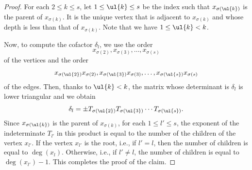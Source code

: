 \begin{proof}
For each $2 \leq k \leq s$, let $1 \leq \ul{k} \leq s$ be the index such that $x_{\sigma(\ul{k})}$ is the parent of $x_{\sigma(k)}$.
It is the unique vertex that is adjacent to $x_{\sigma(k)}$ and whose depth is less than that of $x_{\sigma(k)}$.
Note that we have $1 \leq \ul{k} < k$.

Now, to compute the cofactor $\delta_l$, we use the order
\[
x_{\sigma(2)}, x_{\sigma(3)}, \dots, x_{\sigma(s)}
\]
of the vertices and the order
\[
x_{\sigma(\ul{2})} x_{\sigma(2)}, x_{\sigma(\ul{3})} x_{\sigma(3)}, \dots, x_{\sigma(\ul{s})} x_{\sigma(s)}
\]
of the edges.
Then, thanks to $\ul{k} < k$, the matrix whose determinant is $\delta_l$ is lower triangular and we obtain
\[
\delta_l = \pm T_{\sigma(\ul{2})} T_{\sigma(\ul{3})} \cdots T_{\sigma(\ul{s})}.
\]
Since $x_{\sigma(\ul{k})}$ is the parent of $x_{\sigma(k)}$, for each $1 \leq l' \leq s$, the exponent of the indeterminate $T_{l'}$ in this product is equal to the number of the children of the vertex $x_{l'}$.
If the vertex $x_{l'}$ is the root, i.e., if $l' = l$, then the number of children is equal to $\deg(x_l)$.
Otherwise, i.e., if $l' \neq l$, the number of children is equal to $\deg(x_{l'}) - 1$.
This completes the proof of the claim.
\end{proof}

